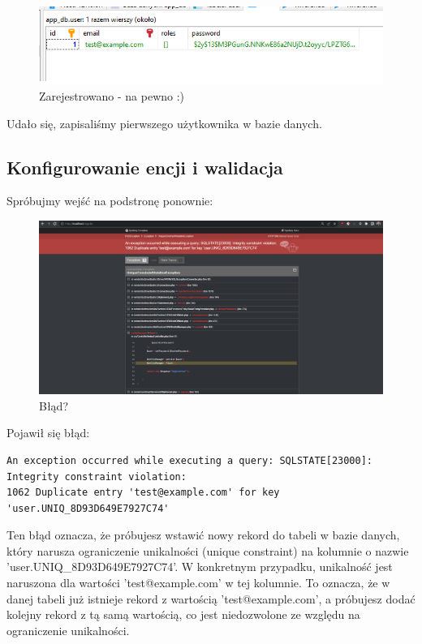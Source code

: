 \documentclass[polish, a4paper]{article}
\begin{document}
\begin{figure}[H]
  \centering
  \includegraphics[width=\textwidth]{user.png}
  \caption{Zarejestrowano - na pewno :)}
\end{figure}

Udało się, zapisaliśmy pierwszego użytkownika w bazie danych. 

\subsection{Konfigurowanie encji i walidacja}
Spróbujmy wejść na podstronę ponownie:

\begin{figure}[H]
  \centering
  \includegraphics[width=\textwidth]{blad.png}
  \caption{Błąd?}
\end{figure}

Pojawił się błąd:

\begin{verbatim}
An exception occurred while executing a query: SQLSTATE[23000]: Integrity constraint violation: 
1062 Duplicate entry 'test@example.com' for key 'user.UNIQ_8D93D649E7927C74'
\end{verbatim}

Ten błąd oznacza, że próbujesz wstawić nowy rekord do tabeli w bazie danych, który narusza ograniczenie unikalności (unique constraint) na kolumnie o nazwie 'user.UNIQ\_8D93D649E7927C74'. W konkretnym przypadku, unikalność jest naruszona dla wartości 'test@example.com' w tej kolumnie. To oznacza, że w danej tabeli już istnieje rekord z wartością 'test@example.com', a próbujesz dodać kolejny rekord z tą samą wartością, co jest niedozwolone ze względu na ograniczenie unikalności.
\end{document}
